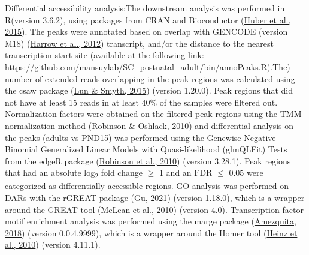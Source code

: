 \documentclass[12pt,twoside]{reedthesis}
\begin{document}
Differential accessibility analysis:The downstream analysis was
performed in R(version 3.6.2), using packages from CRAN and Bioconductor
(\protect\hyperlink{ref-huber2015}{Huber et al., 2015}). The peaks were annotated based on overlap with GENCODE
(version M18) (\protect\hyperlink{ref-harrow2012}{Harrow et al., 2012}) transcript, and/or the distance to the
nearest transcription start site (available at the following link:
\href{https://github.com/mansuylab/SC_postnatal_adult/bin/annoPeaks.R}{https://github.com/mansuylab/SC\_postnatal\_adult/bin/annoPeaks.R)}.The)
number of extended reads overlapping in the peak regions was calculated
using the csaw package (\protect\hyperlink{ref-lun2015}{Lun \& Smyth, 2015}) (version 1.20.0). Peak regions that
did not have at least 15 reads in at least 40\% of the samples were
filtered out. Normalization factors were obtained on the filtered peak
regions using the TMM normalization method (\protect\hyperlink{ref-robinson2010a}{Robinson \& Oshlack, 2010}) and
differential analysis on the peaks (adults vs PND15) was performed using
the Genewise Negative Binomial Generalized Linear Models with
Quasi-likelihood (glmQLFit) Tests from the edgeR package (\protect\hyperlink{ref-robinson2010}{Robinson et al., 2010})
(version 3.28.1). Peak regions that had an absolute log\textsubscript{2} fold change
\(\geq\) 1 and an FDR \(\leq\) 0.05 were categorized as differentially
accessible regions. GO analysis was performed on DARs with the rGREAT
package (\protect\hyperlink{ref-gu2021}{Gu, 2021}) (version 1.18.0), which is a wrapper around the GREAT
tool (\protect\hyperlink{ref-mclean2010}{McLean et al., 2010}) (version 4.0). Transcription factor motif enrichment
analysis was performed using the marge package (\protect\hyperlink{ref-amezquita2018}{Amezquita, 2018}) (version
0.0.4.9999), which is a wrapper around the Homer tool (\protect\hyperlink{ref-heinz2010}{Heinz et al., 2010})
(version 4.11.1).
\end{document}
